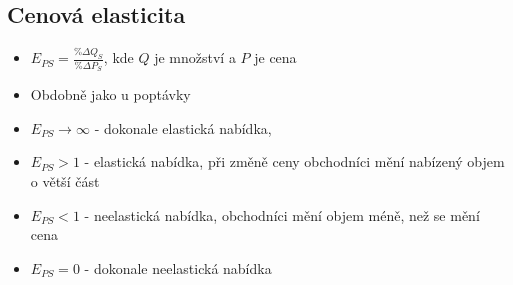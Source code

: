 \subsection{Cenová elasticita}
\begin{itemize}
    \item $E_{PS}=\frac{\% \Delta Q_S}{\% \Delta P_S}$, kde $Q$ je množství a $P$ je cena
    \item Obdobně jako u poptávky
    \item $E_{PS}\rightarrow \infty$ - dokonale elastická nabídka, 
    \item $E_{PS}>1$ - elastická nabídka, při změně ceny obchodníci mění nabízený objem o větší část
    \item $E_{PS}<1$ - neelastická nabídka, obchodníci mění objem méně, než se mění cena
    \item $E_{PS}=0$ - dokonale neelastická nabídka
\end{itemize}